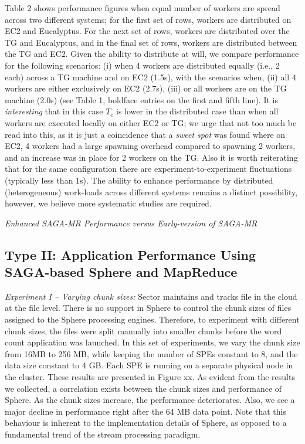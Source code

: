 \documentclass[3p,twocolumn]{elsarticle}
\begin{document}
Table 2 shows performance figures when equal number of workers are
spread across two different systems; for the first set of rows,
workers are distributed on EC2 and Eucalyptus. For the next set of
rows, workers are distributed over the TG and Eucalyptus, and in the
final set of rows, workers are distributed between the TG and EC2.
Given the ability to distribute at will, we compare performance for
the following scenarios: (i) when 4 workers are distributed equally
(i.e., 2 each) across a TG machine and on EC2 (1.5s), with the
scenarios when, (ii) all 4 workers are either exclusively on EC2
(2.7s), (iii) or all workers are on the TG machine (2.0s) (see Table
1, boldface entries on the first and fifth line). It is {\it
  interesting} that in this case $T_c$ is lower in the distributed
case than when all workers are executed locally on either EC2 or TG;
we urge that not too much be read into this, as it is just a
coincidence that a {\it sweet spot} was found where on EC2, 4 workers
had a large spawning overhead compared to spawning 2 workers, and an
increase was in place for 2 workers on the TG. Also it is worth
reiterating that for the same configuration there are
experiment-to-experiment fluctuations (typically less than 1s).  The
ability to enhance performance by distributed (heterogeneous)
work-loads across different systems remains a distinct possibility,
however, we believe more systematic studies are required.


{\it Enhanced SAGA-MR Performance versus Early-version of SAGA-MR}

\subsection{Type II: Application Performance Using SAGA-based Sphere
  and MapReduce}

{\it Experiment I -- Varying chunk sizes:} Sector maintains and tracks
file in the cloud at the file level. There is no support in Sphere to
control the chunk sizes of files assigned to the Sphere processing
engines. Therefore, to experiment with different chunk sizes, the
files were split manually into smaller chunks before the word count
application was launched. In this set of experiments, we vary the
chunk size from 16MB to 256 MB, while keeping the number of SPEs
constant to 8, and the data size constant to 4 GB. Each SPE is running
on a separate physical node in the cluster. These results are
presented in Figure xx. As evident from the results we collected, a
correlation exists between the chunk sizes and performance of Sphere.
As the chunk sizes increase, the performance deteriorates. Also, we
see a major decline in performance right after the 64 MB data
point. Note that this behaviour is inherent to the implementation
details of Sphere, as opposed to a fundamental trend of the stream
processing paradigm.
\end{document}
